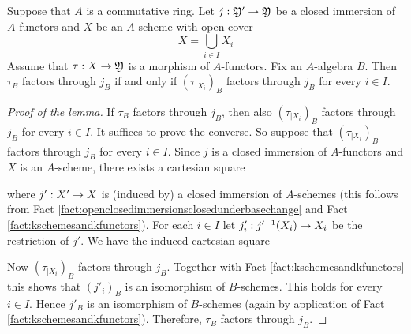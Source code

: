 \begin{lemma}\label{lemma:coveringsandfactorizations}
Suppose that $A$ is a commutative ring. Let $j:{\mathfrak Y}'\rightarrow {\mathfrak Y}$ be a closed immersion of $A$-functors and $X$ be an $A$-scheme with open cover
$$X=\bigcup_{i\in I}X_i$$
Assume that $\tau:X\rightarrow {\mathfrak Y}$ is a morphism of $A$-functors. Fix an $A$-algebra $B$. Then $\tau_B$ factors through $j_B$ if and only if $\left(\tau_{\mid X_i}\right)_B$ factors through $j_B$ for every $i\in I$.
\end{lemma}
\begin{proof}[Proof of the lemma]
If $\tau_B$ factors through $j_B$, then also $\left(\tau_{\mid X_i}\right)_B$ factors through $j_B$ for every $i\in I$. It suffices to prove the converse. So suppose that $\left(\tau_{\mid X_i}\right)_B$ factors through $j_B$ for every $i\in I$. Since $j$ is a closed immersion of $A$-functors and $X$ is an $A$-scheme, there exists a cartesian square
\begin{center}
\end{center}
where $j':X'\rightarrow X$ is (induced by) a closed immersion of $A$-schemes (this follows from Fact \ref{fact:openclosedimmersionsclosedunderbasechange}  and Fact \ref{fact:kschemesandkfunctors}). For each $i\in I$ let $j'_i:j'^{-1}(X_i)\rightarrow X_i$ be the restriction of $j'$. We have the induced cartesian square
\begin{center}
\end{center}
Now $\left(\tau_{\mid X_i}\right)_B$ factors through $j_B$. Together with Fact \ref{fact:kschemesandkfunctors} this shows that $\left(j'_i\right)_B$ is an isomorphism of $B$-schemes. This holds for every $i\in I$. Hence $j'_B$ is an isomorphism of $B$-schemes (again by application of Fact \ref{fact:kschemesandkfunctors}). Therefore, $\tau_B$ factors through $j_B$.
\end{proof}

